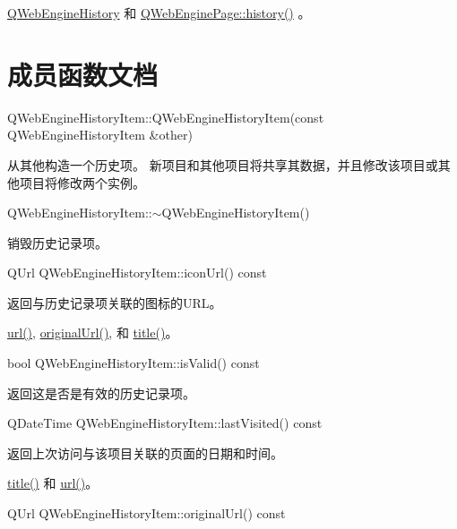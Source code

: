 \begin{seeAlso}
 \href{https://github.com/QtDocumentCN/QtDocumentCN/blob/master/Src/W/QWebEngineHistoryItem/qwebenginehistory.html}{QWebEngineHistory} 和 \href{https://github.com/QtDocumentCN/QtDocumentCN/blob/master/Src/W/QWebEngineHistoryItem/qwebenginepage.html#history}{QWebEnginePage::history()} 。
\end{seeAlso}


\section{成员函数文档}

QWebEngineHistoryItem::QWebEngineHistoryItem(const QWebEngineHistoryItem \&other)

从其他构造一个历史项。 新项目和其他项目将共享其数据，并且修改该项目或其他项目将修改两个实例。

QWebEngineHistoryItem::$\sim$QWebEngineHistoryItem()

销毁历史记录项。

QUrl QWebEngineHistoryItem::iconUrl() const

返回与历史记录项关联的图标的URL。

\begin{seeAlso}
	\href{https://github.com/QtDocumentCN/QtDocumentCN/blob/master/Src/W/QWebEngineHistoryItem/qwebenginehistoryitem.html#url}{url()}, \href{https://github.com/QtDocumentCN/QtDocumentCN/blob/master/Src/W/QWebEngineHistoryItem/qwebenginehistoryitem.html#originalUrl}{originalUrl()}, 和 \href{https://github.com/QtDocumentCN/QtDocumentCN/blob/master/Src/W/QWebEngineHistoryItem/qwebenginehistoryitem.html#title}{title()}。
\end{seeAlso}


bool QWebEngineHistoryItem::isValid() const

返回这是否是有效的历史记录项。

QDateTime QWebEngineHistoryItem::lastVisited() const

返回上次访问与该项目关联的页面的日期和时间。

\begin{seeAlso}
\href{https://github.com/QtDocumentCN/QtDocumentCN/blob/master/Src/W/QWebEngineHistoryItem/qwebenginehistoryitem.html#title}{title()} 和 \href{https://github.com/QtDocumentCN/QtDocumentCN/blob/master/Src/W/QWebEngineHistoryItem/qwebenginehistoryitem.html#url}{url()}。
\end{seeAlso}

QUrl QWebEngineHistoryItem::originalUrl() const

